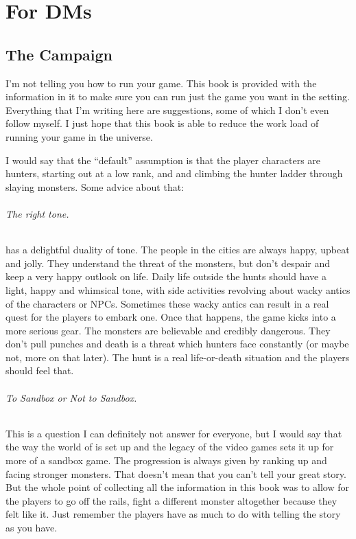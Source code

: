 \renewcommand*{\hbPartCover}{assets/ext/forest-sleeps}
\part{For DMs}

\chapter{The Campaign}
I'm not telling you how to run your game. This book is provided with the information in it to make sure you can run just the game you want in the setting. Everything that I'm writing here are suggestions, some of which I don't even follow myself. I just hope that this book is able to reduce the work load of running your game in the \MH{} universe.

I would say that the ``default'' assumption is that the player characters are hunters, starting out at a low rank, and and climbing the hunter ladder through slaying monsters. Some advice about that:

\paragraph{The right tone.} \MH{} has a delightful duality of tone. The people in the cities are always happy, upbeat and jolly. They understand the threat of the monsters, but don't despair and keep a very happy outlook on life. Daily life outside the hunts should have a light, happy and whimsical tone, with side activities revolving about wacky antics of the characters or NPCs. Sometimes these wacky antics can result in a real quest for the players to embark one. Once that happens, the game kicks into a more serious gear. The monsters are believable and credibly dangerous. They don't pull punches and death is a threat which hunters face constantly (or maybe not, more on that later). The hunt is a real life-or-death situation and the players should feel that.

\paragraph{To Sandbox or Not to Sandbox.} This is a question I can definitely not answer for everyone, but I would say that the way the world of \MH{} is set up and the legacy of the video games sets it up for more of a sandbox game. The progression is always given by ranking up and facing stronger monsters. That doesn't mean that you can't tell your great story. But the whole point of collecting all the information in this book was to allow for the players to go off the rails, fight a different monster altogether because they felt like it. Just remember the players have as much to do with telling the story as you have.

